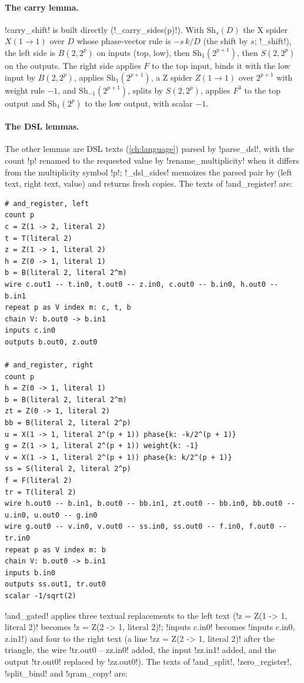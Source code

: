\paragraph{The carry lemma.} \code!carry_shift! is built directly (\py!_carry_sides(p)!). With $\mathrm{Sh}_s(D)$ the X spider $X(1\to1)$ over $D$ whose phase-vector rule is $-s\,k/D$ (the shift by $s$; \py!_shift!), the left side is $B(2,2^p)$ on inputs (top, low), then $\mathrm{Sh}_1(2^{p+1})$, then $S(2,2^p)$ on the outputs. The right side applies $F$ to the top input, binds it with the low input by $B(2,2^p)$, applies $\mathrm{Sh}_1(2^{p+1})$, a Z spider $Z(1\to1)$ over $2^{p+1}$ with weight rule $-1$, and $\mathrm{Sh}_{-1}(2^{p+1})$, splits by $S(2,2^p)$, applies $F^3$ to the top output and $\mathrm{Sh}_1(2^p)$ to the low output, with scalar $-1$.

\paragraph{The DSL lemmas.} The other lemmas are DSL texts (\cref{ch:language}) parsed by \py!parse_dsl!, with the count \code!p! renamed to the requested value by \py!rename_multiplicity! when it differs from the multiplicity symbol \code!p!; \py!_dsl_sides! memoizes the parsed pair by (left text, right text, value) and returns fresh copies. The texts of \code!and_register! are:
\begin{lstlisting}[style=azx]
# and_register, left
count p
c = Z(1 -> 2, literal 2)
t = T(literal 2)
z = Z(1 -> 1, literal 2)
h = Z(0 -> 1, literal 1)
b = B(literal 2, literal 2^m)
wire c.out1 -- t.in0, t.out0 -- z.in0, c.out0 -- b.in0, h.out0 -- b.in1
repeat p as V index m: c, t, b
chain V: b.out0 -> b.in1
inputs c.in0
outputs b.out0, z.out0

# and_register, right
count p
h = Z(0 -> 1, literal 1)
b = B(literal 2, literal 2^m)
zt = Z(0 -> 1, literal 2)
bb = B(literal 2, literal 2^p)
u = X(1 -> 1, literal 2^(p + 1)) phase{k: -k/2^(p + 1)}
g = Z(1 -> 1, literal 2^(p + 1)) weight{k: -1}
v = X(1 -> 1, literal 2^(p + 1)) phase{k: k/2^(p + 1)}
ss = S(literal 2, literal 2^p)
f = F(literal 2)
tr = T(literal 2)
wire h.out0 -- b.in1, b.out0 -- bb.in1, zt.out0 -- bb.in0, bb.out0 -- u.in0, u.out0 -- g.in0
wire g.out0 -- v.in0, v.out0 -- ss.in0, ss.out0 -- f.in0, f.out0 -- tr.in0
repeat p as V index m: b
chain V: b.out0 -> b.in1
inputs b.in0
outputs ss.out1, tr.out0
scalar -1/sqrt(2)
\end{lstlisting}
\code!and_gated! applies three textual replacements to the left text (\code!z = Z(1 -> 1, literal 2)! becomes \code!z = Z(2 -> 1, literal 2)!; \code!inputs c.in0! becomes \code!inputs c.in0, z.in1!) and four to the right text (a line \code!zz = Z(2 -> 1, literal 2)! after the triangle, the wire \code!tr.out0 -- zz.in0! added, the input \code!zz.in1! added, and the output \code!tr.out0! replaced by \code!zz.out0!). The texts of \code!and_split!, \code!zero_register!, \code!split_bind! and \code!qram_copy! are:
